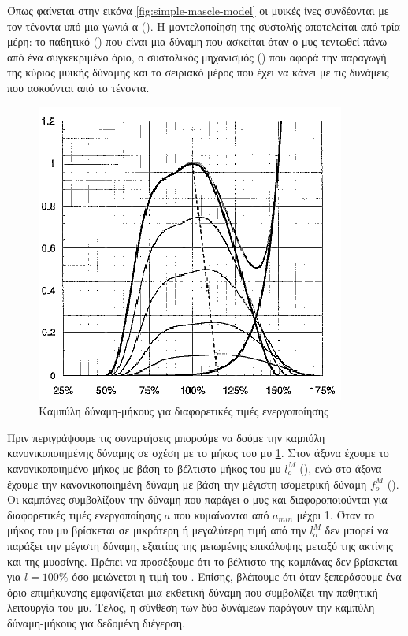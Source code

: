 Όπως φαίνεται στην εικόνα \ref{fig:simple-mascle-model} οι μυικές ίνες συνδέονται με τον τένοντα υπό μια γωνιά α (). Η μοντελοποίηση της συστολής αποτελείται από τρία μέρη: το παθητικό () που είναι μια δύναμη που ασκείται όταν ο μυς τεντωθεί πάνω από ένα συγκεκριμένο όριο, ο συστολικός μηχανισμός () που αφορά την παραγωγή της κύριας μυικής δύναμης και το σειριακό μέρος που έχει να κάνει με τις δυνάμεις που ασκούνται από το τένοντα.

\begin{figure}[H]
    \centering
    \includegraphics[width=.5\textwidth, height=.35\textheight, keepaspectratio]{fig/active-force-legnth.png}
    \caption{Καμπύλη δύναμη-μήκους για διαφορετικές τιμές ενεργοποίησης \cite{buchanan04}}
    \label{fig:active-force-legnth}
\end{figure}

Πριν περιγράψουμε τις συναρτήσεις μπορούμε να δούμε την καμπύλη κανονικοποιημένης δύναμης σε σχέση με το μήκος του μυ \ref{fig:active-force-legnth}. Στον άξονα  έχουμε το κανονικοποιημένο μήκος με βάση το βέλτιστο μήκος του μυ $l^{M}_{o}$ (), ενώ στο άξονα  έχουμε την κανονικοποιημένη δύναμη με βάση την μέγιστη ισομετρική δύναμη $f^{M}_{o}$ (). Οι καμπάνες συμβολίζουν την δύναμη που παράγει ο μυς και διαφοροποιούνται για διαφορετικές τιμές ενεργοποίησης $a$ που κυμαίνονται από $a_{min}$ μέχρι 1. Όταν το μήκος του μυ βρίσκεται σε μικρότερη ή μεγαλύτερη τιμή από την $l^{M}_{o}$ δεν μπορεί να παράξει την μέγιστη δύναμη, εξαιτίας της μειωμένης επικάλυψης μεταξύ της ακτίνης και της μυοσίνης. Πρέπει να προσέξουμε ότι το βέλτιστο της καμπάνας δεν βρίσκεται για $l = 100\%$ όσο μειώνεται η τιμή του . Επίσης, βλέπουμε ότι όταν ξεπεράσουμε ένα όριο επιμήκυνσης εμφανίζεται μια εκθετική δύναμη που συμβολίζει την παθητική λειτουργία του μυ. Τέλος, η σύνθεση των δύο δυνάμεων παράγουν την καμπύλη δύναμη-μήκους για δεδομένη διέγερση.

